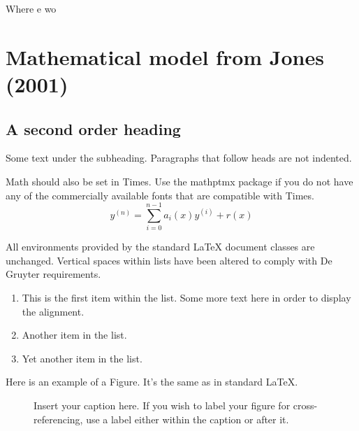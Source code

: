 \documentclass[letterpaper,12pt]{article}
\begin{document}
Where
e wo
\section{Mathematical model from Jones (2001)}


\subsection{A second order heading}

Some text under the subheading. Paragraphs that follow heads are not
indented.

Math should also be set in Times. Use the mathptmx package if you do not have
any of the commercially available fonts that are compatible with Times.
\begin{equation}
    y^{(n)} = \sum_{i=0}^{n-1} a_i(x) y^{(i)} + r(x) 
\end{equation}

All environments provided by the standard LaTeX document classes are
unchanged. Vertical spaces within lists have been altered to comply with De Gruyter
requirements.
\begin{enumerate}
\item This is the first item within the list. Some more text here in order to
  display the alignment.
\item Another item in the list.
\item Yet another item in the list.
\end{enumerate}

Here is an example of a Figure. It's the same as in standard LaTeX.

\begin{figure}[!h]
\centering
\caption{Insert your caption here. If you wish to label your figure for
  cross-referencing, use a label either within the caption or after it.}
\label{fig1}
\end{figure}
\end{document}
